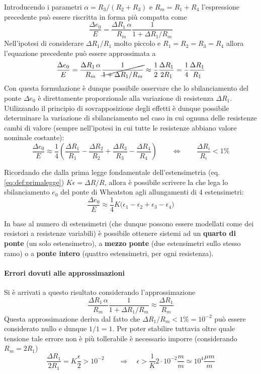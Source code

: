 		Introducendo i parametri $\alpha= R_3 / (R_2+R_3)$ e $R_m = R_1+R_4$ l'espressione precedente può essere riscritta in forma più compatta come
		\[ \frac{\Delta e_0}{E} = \frac{\Delta R_1 \, \alpha}{R_m} \frac{1}{1+\Delta R_1/R_m} \]
		Nell'ipotesi di considerare $\Delta R_1/R_1$ molto piccolo e $R_1=R_2=R_3=R_4$ allora l'equazione precedente può essere approssimata a
		\[ \frac{\Delta e_0}{E} = \frac{\Delta R_1 \, \alpha}{R_m} \cancel{\frac{1}{1+\Delta R_1/R_m}} \approx \frac 1 2 \frac{\Delta R_1}{2R_1} = \frac 1 4 \frac{\Delta R_1}{R_1} \]
		Con questa formulazione è dunque possibile osservare che lo sbilanciamento del ponte $\Delta e_0$ è direttamente proporzionale alla variazione di resistenza $\Delta R_1$. Utilizzando il principio di sovrapposizione degli effetti è dunque possibile determinare la variazione di sbilanciamento nel caso in cui ognuna delle resistenze cambi di valore (sempre nell'ipotesi in cui tutte le resistenze abbiano valore nominale costante):
		\[ \frac{\Delta e_0}{E} \approx \frac 1 4 \left( \frac{\Delta R_1}{R_1} - \frac{\Delta R_2}{R_2} +\frac{\Delta R_3}{R_3} - \frac{\Delta R_4}{R_4} \right) \qquad \Leftrightarrow \qquad \frac{\Delta R_i}{R_i} < 1\% \]
		
		\begin{concetto}
			Ricordando che dalla prima legge fondamentale dell'estensimetria (eq. \ref{eq:def:primalegge}) $K\epsilon = \Delta R / R$, allora è possibile scrivere la  che lega lo sbilanciamento $e_0$ del ponte di Wheatston agli allungamenti di 4 estensimetri:
			\begin{equation}
				\frac{\Delta e_0}{E} \approx \frac 1 4 K \big( \epsilon_1 - \epsilon_2 + \epsilon_3 - \epsilon_4  \big)
			\end{equation}
		\end{concetto}
		
		In base al numero di estensimetri (che dunque possono essere modellati come dei resistori a resistenze variabili) è possibile ottenere sistemi ad un \textbf{quarto di ponte} (un solo estensimetro), a \textbf{mezzo ponte} (due estensimetri sullo stesso ramo) o a \textbf{ponte intero} (quattro estensimetri, per ogni resistenza).
		
		\paragraph{Errori dovuti alle approssimazioni} Si è arrivati a questo risultato considerando l'approssimazione
		\[\frac{\Delta R_1 \, \alpha}{R_m} \frac{1}{1+\Delta R_1/R_m} \approx \frac{\Delta R_1}{R_m} \]
		Questa approssimazione deriva dal fatto che $\Delta R_1/R_m < 1\% = 10^{-2}$ può essere considerato nullo e dunque $1/1=1$. Per poter stabilire tuttavia oltre quale tensione tale errore non è più tollerabile è necessario imporre (considerando $R_m = 2R_1$)
		\[ \frac{\Delta R_1}{2R_1} = K \frac\epsilon 2 > 10^{-2} \qquad \Rightarrow \quad \epsilon> \frac 1 K 2\cdot 10^{-2} \frac m m \simeq 10^4 \frac{\mu m}{m}  \]
		
